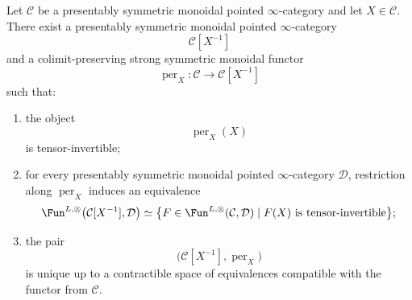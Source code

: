 \begin{theorem}
\label{thm:presentable-periodization}
Let \(\mathcal C\) be a presentably symmetric monoidal pointed
\(\infty\)-category and let \(X\in\mathcal C\).  There exist a presentably
symmetric monoidal pointed \(\infty\)-category
\[
    \mathcal C[X^{-1}]
\]
and a colimit-preserving strong symmetric monoidal functor
\[
    \operatorname{per}_X:
    \mathcal C
    \longrightarrow
    \mathcal C[X^{-1}]
\]
such that:
\begin{enumerate}
    \item the object
    \[
        \operatorname{per}_X(X)
    \]
    is tensor-invertible;

    \item for every presentably symmetric monoidal pointed
    \(\infty\)-category \(\mathcal D\), restriction along
    \(\operatorname{per}_X\) induces an equivalence
    \[
    \begin{aligned}
        \Fun^{L,\otimes}
        \bigl(
          \mathcal C[X^{-1}],
          \mathcal D
        \bigr)
        \simeq
        \bigl\{
          F\in
          \Fun^{L,\otimes}(\mathcal C,\mathcal D)
          \mid
          F(X)\text{ is tensor-invertible}
        \bigr\};
    \end{aligned}
    \]

    \item the pair
    \[
        \bigl(
          \mathcal C[X^{-1}],
          \operatorname{per}_X
        \bigr)
    \]
    is unique up to a contractible space of equivalences compatible with
    the functor from \(\mathcal C\).
\end{enumerate}
\end{theorem}

